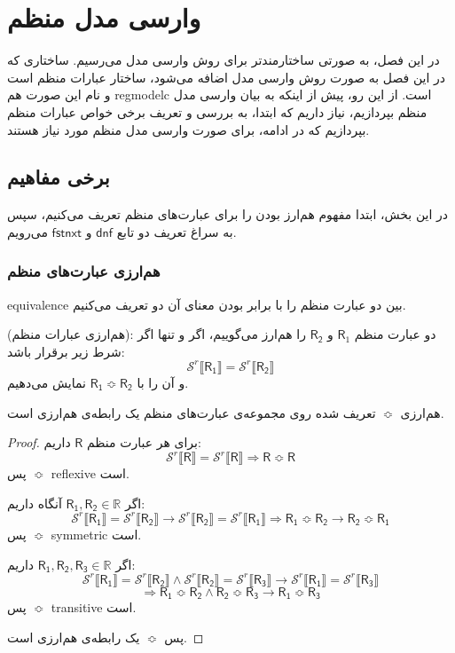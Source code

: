 \chapter{وارسی مدل منظم}
در این فصل، به صورتی ساختارمندتر برای روش وارسی مدل می‌رسیم. ساختاری که در این فصل به صورت روش وارسی مدل اضافه می‌شود، ساختار عبارات منظم است و نام این صورت هم \gls{regmodelc} است. از این رو، پیش از اینکه به بیان وارسی مدل منظم بپردازیم، نیاز داریم که ابتدا، به بررسی و تعریف برخی خواص عبارات منظم بپردازیم که در ادامه، برای صورت وارسی مدل منظم مورد نیاز هستند.

\section{برخی مفاهیم}
در این بخش، ابتدا مفهوم هم‌ارز بودن را برای عبارت‌های منظم تعریف می‌کنیم، سپس به سراغ تعریف دو تابع 
$\mathsf{dnf}$
و 
$\mathsf{fstnxt}$
می‌رویم. 
\subsection{هم‌ارزی عبارت‌های منظم}
‌\gls{equivalence} بین دو عبارت منظم را با برابر بودن معنای آن دو تعریف می‌کنیم.
\begin{defn}
	(هم‌ارزی عبارات منظم):
	دو عبارت منظم
	$\mathsf{R}_1$
	و
	$\mathsf{R_2}$
	 را هم‌ارز می‌گوییم، اگر و تنها اگر شرط زیر برقرار باشد:
	 $$\mathcal{S}^r \llbracket \mathsf{R_1} \rrbracket = \mathcal{S}^r \llbracket \mathsf{R_2} \rrbracket$$ 
	 و آن را با 
	 $\mathsf{R_1} \Bumpeq \mathsf{R_2}$
	 نمایش می‌دهیم.
\end{defn}

\begin{thm}
	هم‌ارزی $\Bumpeq$ تعریف شده روی مجموعه‌ی عبارت‌های منظم یک رابطه‌ی هم‌ارزی است.
\end{thm}
\begin{proof}
	برای هر عبارت منظم $\mathsf{R}$ داریم:
	$$\mathcal{S}^r \llbracket \mathsf{R} \rrbracket = 
	\mathcal{S}^r \llbracket \mathsf{R} \rrbracket \Rightarrow
	\mathsf{R} \Bumpeq \mathsf{R}$$
	پس $\Bumpeq$ \gls*{reflexive} است.
	
	اگر 
	$\mathsf{R_1 , R_2} \in \mathbb{R}$
	آنگاه داریم:
	$$\mathcal{S}^r \llbracket \mathsf{R_1} \rrbracket =
	\mathcal{S}^r \llbracket \mathsf{R_2} \rrbracket \rightarrow
	\mathcal{S}^r \llbracket \mathsf{R_2} \rrbracket =
	\mathcal{S}^r \llbracket \mathsf{R_1} \rrbracket \Rightarrow
	\mathsf{R_1} \Bumpeq \mathsf{R_2} \rightarrow
	\mathsf{R_2} \Bumpeq \mathsf{R_1}$$
	پس $\Bumpeq$ \gls*{symmetric} است.
	
	اگر
	 $\mathsf{R_1,R_2,R_3} \in \mathbb{R}$
	 	داریم:
	 $$\mathcal{S}^r \llbracket \mathsf{R_1} \rrbracket =
	 \mathcal{S}^r \llbracket \mathsf{R_2} \rrbracket \land
	 \mathcal{S}^r \llbracket \mathsf{R_2} \rrbracket =
	 \mathcal{S}^r \llbracket \mathsf{R_3} \rrbracket \rightarrow
	 \mathcal{S}^r \llbracket \mathsf{R_1} \rrbracket =
	 \mathcal{S}^r \llbracket \mathsf{R_3} \rrbracket$$
	 $$\Rightarrow
	 \mathsf{R_1} \Bumpeq \mathsf{R_2} \land
	 \mathsf{R_2} \Bumpeq \mathsf{R_3} \rightarrow
	 \mathsf{R_1} \Bumpeq \mathsf{R_3}$$
	 پس $\Bumpeq$ \gls*{transitive} است.
	 
	 پس $\Bumpeq$ یک رابطه‌ی هم‌ارزی است.
\end{proof}



